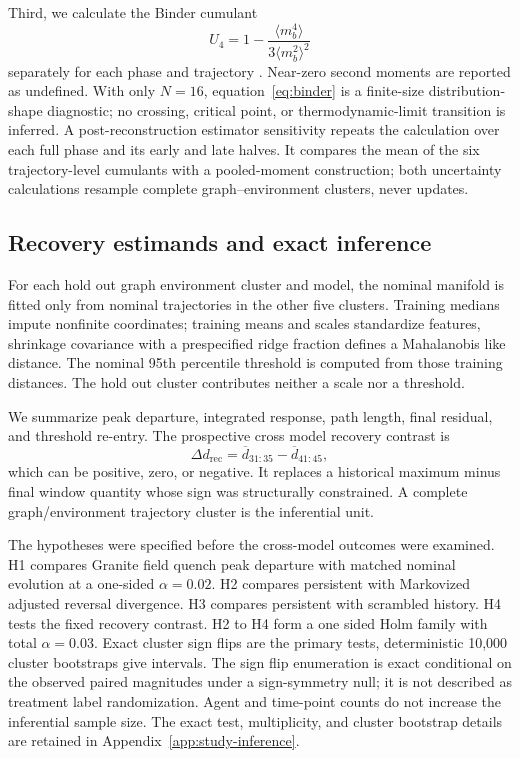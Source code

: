 \documentclass[12pt]{article}
\begin{document}
Third, we calculate the Binder cumulant
\begin{equation}
U_4=1-\frac{\langle m_b^4\rangle}
{3\langle m_b^2\rangle^2}
\label{eq:binder}
\end{equation}
separately for each phase and trajectory \cite{binder1981}.  Near-zero second moments are
reported as undefined.  With only $N=16$, equation~\eqref{eq:binder} is a
finite-size distribution-shape diagnostic; no crossing, critical point, or
thermodynamic-limit transition is inferred.  A post-reconstruction estimator
sensitivity repeats the calculation over each full phase and its early and
late halves.  It compares the mean of the six trajectory-level cumulants with
a pooled-moment construction; both uncertainty calculations resample complete
graph--environment clusters, never updates.





\subsection{Recovery estimands and exact inference}
\label{sec:inferential-design}

For each hold out graph environment cluster and model, the nominal manifold is
fitted only from nominal trajectories in the other five clusters.  Training
medians impute nonfinite coordinates; training means and scales standardize
features, shrinkage covariance with a prespecified ridge fraction defines a
Mahalanobis like distance.  The nominal 95th percentile threshold is computed
from those training distances.  The hold out cluster contributes neither a
scale nor a threshold.

We summarize peak departure, integrated response, path length, final residual,
and threshold re-entry.  The prospective cross model recovery contrast is
\begin{equation}
\Delta d_{\mathrm{rec}}=
\overline d_{31:35}-\overline d_{41:45},
\end{equation}
which can be positive, zero, or negative.  It replaces a historical maximum
minus final window quantity whose sign was structurally constrained.
A complete graph/environment trajectory cluster is the
inferential unit.

The hypotheses were specified before the cross-model outcomes were examined.
H1 compares Granite field quench peak
departure with matched nominal evolution at a one-sided $\alpha=0.02$.  H2
compares persistent with Markovized adjusted reversal divergence.  H3 compares
persistent with scrambled history.  H4 tests the fixed recovery contrast.
H2 to H4 form a one sided Holm family with total $\alpha=0.03$.  Exact cluster
sign flips are the primary tests, deterministic 10,000 cluster bootstraps give
intervals.  The sign flip enumeration is exact conditional on the observed
paired magnitudes under a sign-symmetry null; it is not described as treatment label randomization.
Agent and time-point counts do not increase the inferential sample size.
The exact test, multiplicity, and cluster bootstrap details are retained in Appendix~\ref{app:study-inference}.
\end{document}
